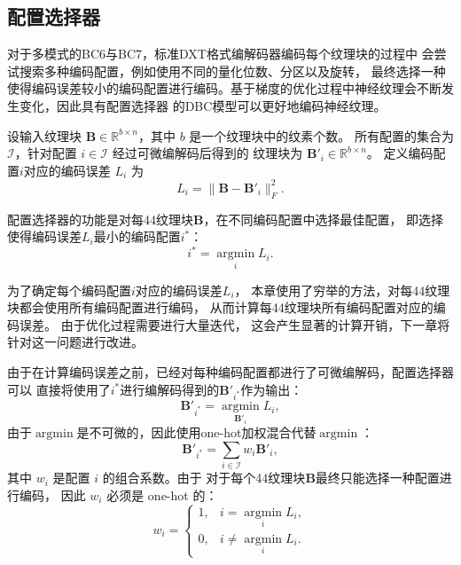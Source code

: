 \subsection{配置选择器}

对于多模式的BC6与BC7，标准DXT格式编解码器编码每个纹理块的过程中
会尝试搜索多种编码配置，例如使用不同的量化位数、分区以及旋转，
最终选择一种使得编码误差较小的编码配置进行编码。基于梯度的优化过程中神经纹理会不断发生变化，因此具有配置选择器
的DBC模型可以更好地编码神经纹理。

设输入纹理块 $\mathbf{B}\in\mathbb{R}^{b\times n}$，其中 $b$ 是一个纹理块中的纹素个数。
所有配置的集合为 $\mathcal{I}$，针对配置 $i\in\mathcal{I}$ 经过可微编解码后得到的
纹理块为 $\mathbf{B}'_i\in\mathbb{R}^{b\times n}$。
定义编码配置$i$对应的编码误差 $L_i$ 为
\begin{equation}
L_i=\|\mathbf{B}-\mathbf{B}'_i\|_F^2.
\end{equation}

配置选择器的功能是对每4\times4纹理块$\mathbf{B}$，在不同编码配置中选择最佳配置，
即选择使得编码误差$L_i$最小的编码配置$i^*$：
\begin{equation}
    i^*=\mathop{\arg\min}\limits_{i} L_i.
\end{equation}

为了确定每个编码配置$i$对应的编码误差$L_i$，
本章使用了穷举的方法，对每4\times4纹理块都会使用所有编码配置进行编码，
从而计算每4\times4纹理块所有编码配置对应的编码误差。
由于优化过程需要进行大量迭代，
这会产生显著的计算开销，下一章将针对这一问题进行改进。

由于在计算编码误差之前，已经对每种编码配置都进行了可微编解码，配置选择器可以
直接将使用了$i^*$进行编解码得到的$\mathbf{B}'_{i^*}$作为输出：
\begin{equation}
    \mathbf{B}'_{i^*}=\mathop{\arg\min}\limits_{\mathbf{B}'_i} L_i,
\end{equation}
由于$\mathop{\arg\min}$是不可微的，因此使用one-hot加权混合代替$\mathop{\arg\min}$：
\begin{equation}
\mathbf{B}'_{i^*}=\sum_{i\in\mathcal{I}} w_i\mathbf{B}'_i,
\end{equation}
其中 $w_i$ 是配置 $i$ 的组合系数。由于
对于每个4\times4纹理块$\mathbf{B}$最终只能选择一种配置进行编码，
因此 $w_i$ 必须是 one-hot 的：
\begin{equation}
    w_i =\left\{\begin{matrix}
        1,& i=\mathop{\arg\min}\limits_{i} L_i,
        \\0,& i\ne\mathop{\arg\min}\limits_{i} L_i.
        \end{matrix}\right.
\end{equation}

